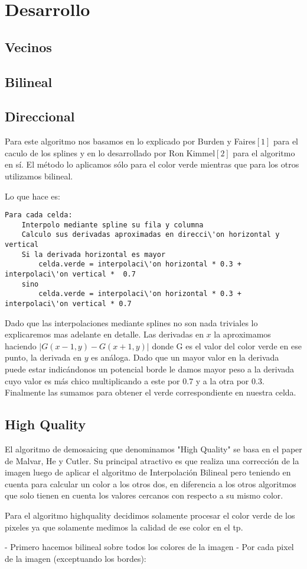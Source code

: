 \section{Desarrollo}

\subsection{Vecinos}

\subsection{Bilineal}

\subsection{Direccional}

Para este algoritmo nos basamos en lo explicado por Burden y Faires$[1]$ para el caculo de los splines y en lo desarrollado por Ron Kimmel$[2]$ para el algoritmo en sí. El método lo aplicamos sólo para el color verde mientras que para los otros utilizamos bilineal. 

Lo que hace es:
\begin{lstlisting}[frame=single] 
Para cada celda:
	Interpolo mediante spline su fila y columna
	Calculo sus derivadas aproximadas en direcci\'on horizontal y vertical
	Si la derivada horizontal es mayor
		celda.verde = interpolaci\'on horizontal * 0.3 +  interpolaci\'on vertical *  0.7
	sino
		celda.verde = interpolaci\'on horizontal * 0.3 +  interpolaci\'on vertical * 0.7	
\end{lstlisting}

Dado que las interpolaciones mediante splines no son nada triviales lo explicaremos mas adelante en detalle. Las derivadas en $x$  la aproximamos haciendo $|G(x-1,y)-G(x+1,y)|$ donde G es el valor del color verde en ese punto, la derivada en $y$ es análoga. Dado que un mayor valor en la derivada puede estar indicándonos un potencial borde le damos mayor peso a la derivada cuyo valor es más chico multiplicando a este por 0.7 y a la otra por 0.3. Finalmente las sumamos para obtener el verde correspondiente en nuestra celda.

\subsection{High Quality}

El algoritmo de demosaicing que denominamos "High Quality" se basa en el paper de Malvar, He y Cutler. Su principal atractivo es que realiza una corrección de la imagen luego de aplicar el algoritmo de Interpolación Bilineal pero teniendo en cuenta para calcular un color a los otros dos, en diferencia a los otros algoritmos que solo tienen en cuenta los valores cercanos con respecto a su mismo color.


Para el algoritmo highquality decidimos solamente procesar el color verde de los pixeles ya que solamente medimos la calidad de ese color en el tp.

- Primero hacemos bilineal sobre todos los colores de la imagen
- Por cada pixel de la imagen (exceptuando los bordes):
		
	


